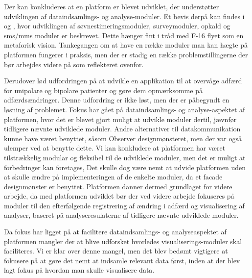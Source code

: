Der kan konkluderes at en platform er blevet udviklet, der understøtter udviklingen af dataindsamlings- og analyse-moduler.
Et bevis derpå kan findes i \citet{misc:soevnrapp} og \citet{misc:surveyrapp}, hvor udviklingen af søvnestimeringsmoduler, surveymoduler, opkald og sms/mms moduler er beskrevet.
Dette hænger fint i tråd med F-16 flyet som en metaforisk vision.
Tankegangen om at have en række moduler man kan hægte på platformen fungerer i praksis, men der er stadig en række problemstillingerne der bør arbejdes videre på som reflekteret ovenfor.

Derudover lød udfordringen på at udvikle en applikation til at overvåge adfærd for unipolare og bipolare patienter og gøre dem opmærksomme på adfærdsændringer.
Denne udfordring er ikke løst, men der er påbegyndt en løsning af problemet.
Fokus har gået på dataindsamlings- og analyse-aspektet af platformen, hvor det er blevet gjort muligt at udvikle moduler dertil, jævnfør tidligere nævnte udviklede moduler.
Andre alternativer til datakommunikation kunne have været benyttet, såsom Observer designmønsteret, men der var også ulemper ved at benytte dette.
Vi kan konkludere at platformen har været tilstrækkelig modular og fleksibel til de udviklede moduler, men det er muligt at forbedringer kan foretages,
Det skulle dog være nemt at udvide platformen uden at skulle ændre på implementeringen af de enkelte moduler, da et facade designmønster er benyttet.
Platformen danner dermed grundlaget for videre arbejde, da med platformen udviklet bør der ved videre arbejde fokuseres på moduler til den efterfølgende registrering af ændring i adfærd og visualisering af analyser, baseret på analyseresulaterne af tidligere nævnte udviklede moduler.

Da fokus har ligget på at facilitere dataindsamlings- og analyseaspektet af platformen mangler der at blive udforsket hvorledes visualiserings-moduler skal faciliteres.
Vi er klar over denne mangel, men det blev bedømt vigtigere at fokusere på at gøre det nemt at indsamle relevant data først, inden at der blev lagt fokus på hvordan man skulle visualisere data.



